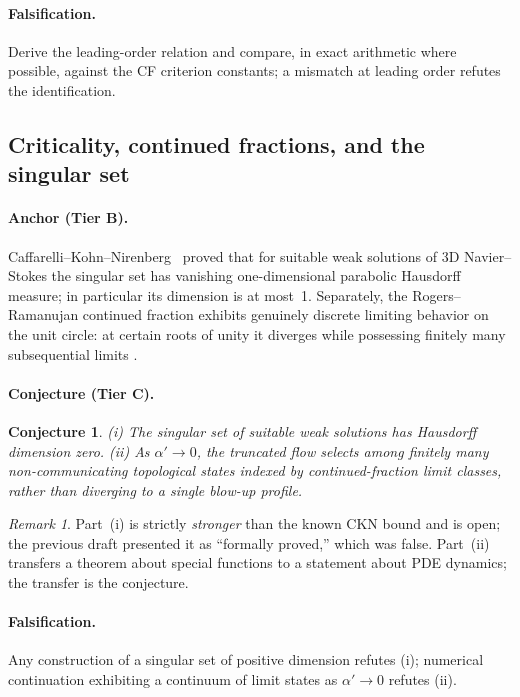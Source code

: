 \documentclass[11pt,a4paper]{article}
\theoremstyle{plain}
\newtheorem{conjecture}{Conjecture}
\theoremstyle{definition}
\theoremstyle{remark}
\newtheorem{remark}{Remark}
\newcommand{\tierB}{\textbf{Tier B}}
\newcommand{\tierC}{\textbf{Tier C}}
\begin{document}
\paragraph{Falsification.} Derive the leading-order relation and compare, in
exact arithmetic where possible, against the CF criterion constants; a
mismatch at leading order refutes the identification.

\subsection{Criticality, continued fractions, and the singular set}
\label{sec:phase}

\paragraph{Anchor (\tierB{}).}
Caffarelli--Kohn--Nirenberg~\cite{CKN1982} proved that for suitable weak
solutions of 3D Navier--Stokes the singular set has vanishing
one-dimensional parabolic Hausdorff measure; in particular its dimension is
at most~1. Separately, the Rogers--Ramanujan continued fraction exhibits
genuinely discrete limiting behavior on the unit circle: at certain roots of
unity it diverges while possessing finitely many subsequential limits
\cite{BowmanMcLaughlin2004,AndrewsBerndt}.

\paragraph{Conjecture (\tierC{}).}
\begin{conjecture}\label{conj:dim0}
(i) The singular set of suitable weak solutions has Hausdorff dimension
zero. (ii) As $\alpha'\to 0$, the truncated flow selects among finitely many
non-communicating topological states indexed by continued-fraction limit
classes, rather than diverging to a single blow-up profile.
\end{conjecture}

\begin{remark}
Part~(i) is strictly \emph{stronger} than the known CKN bound and is open;
the previous draft presented it as ``formally proved,'' which was false.
Part~(ii) transfers a theorem about special functions to a statement about
PDE dynamics; the transfer is the conjecture.
\end{remark}

\paragraph{Falsification.} Any construction of a singular set of positive
dimension refutes (i); numerical continuation exhibiting a continuum of
limit states as $\alpha'\to 0$ refutes (ii).
\end{document}
